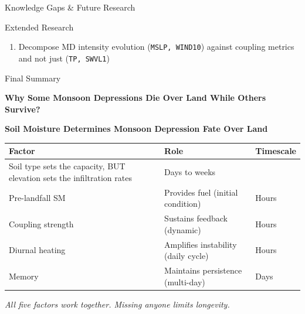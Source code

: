 \begin{frame}{Knowledge Gaps \& Future Research}
	\begin{block}{Extended Research}
		\footnotesize
		\begin{enumerate}
			\item Decompose MD intensity evolution (\texttt{MSLP, WIND10}) against coupling metrics and not just (\texttt{TP, SWVL1})
		\end{enumerate}
	\end{block}
\end{frame}

\begin{frame}{Final Summary}
	\begin{center}
		\textbf{Why Some Monsoon Depressions Die Over Land While Others Survive?}

		\vspace{0.5cm}
		\textbf{Soil Moisture Determines Monsoon Depression Fate Over Land}

		\vspace{0.5cm}
		\footnotesize
		\begin{tabular}{lll}
			\toprule
			\textbf{Factor}                                                        & \textbf{Role}                       & \textbf{Timescale} \\
			\midrule
			Soil type sets the capacity, BUT elevation sets the infiltration rates & Days to weeks                                            \\
			Pre-landfall SM                                                        & Provides fuel (initial condition)   & Hours              \\
			Coupling strength                                                      & Sustains feedback (dynamic)         & Hours              \\
			Diurnal heating                                                        & Amplifies instability (daily cycle) & Hours              \\
			Memory                                                                 & Maintains persistence (multi-day)   & Days               \\
			\bottomrule
		\end{tabular}

		\vspace{0.3cm}
		\footnotesize
		\textit{All five factors work together. Missing anyone limits longevity.}
	\end{center}


\end{frame}
